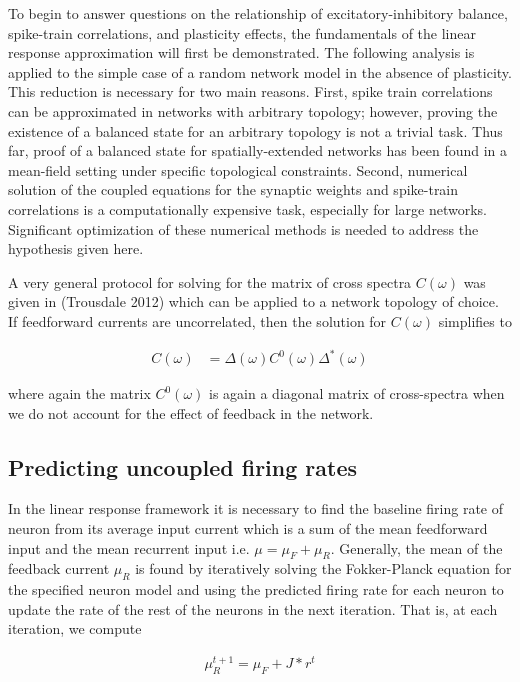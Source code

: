 \documentclass{ucetd}
\begin{document}
To begin to answer questions on the relationship of excitatory-inhibitory balance, spike-train correlations, and plasticity effects, the fundamentals of the linear response approximation will first be demonstrated. The following analysis is applied to the simple case of a random network model in the absence of plasticity. This reduction is necessary for two main reasons. First, spike train correlations can be approximated in networks with arbitrary topology; however, proving the existence of a balanced state for an arbitrary topology is not a trivial task. Thus far, proof of a balanced state for spatially-extended networks has been found in a mean-field setting under specific topological constraints. Second, numerical solution of the coupled equations for the synaptic weights and spike-train correlations is a computationally expensive task, especially for large networks. Significant optimization of these numerical methods is needed to address the hypothesis given here.

A very general protocol for solving for the matrix of cross spectra $C(\omega)$ was given in (Trousdale 2012) which can be applied to a network topology of choice. If feedforward currents are uncorrelated, then the solution for $C(\omega)$ simplifies to 

\begin{align}
C(\omega) &= \Delta(\omega)C^{0}(\omega)\Delta^{*}(\omega)
\end{align}

where again the matrix $C^{0}(\omega)$ is again a diagonal matrix of cross-spectra when we do not account for the effect of feedback in the network. 

\subsection{Predicting uncoupled firing rates}

In the linear response framework it is necessary to find the baseline firing rate of neuron from its average input current which is a sum of the mean feedforward input and the mean recurrent input i.e. $\mu = \mu_{F} + \mu_{R}$. Generally, the mean of the feedback current $\mu_{R}$ is found by iteratively solving the Fokker-Planck equation for the specified neuron model and using the predicted firing rate for each neuron to update the rate of the rest of the neurons in the next iteration. That is, at each iteration, we compute

\begin{align*}
\mu_{R}^{t+1} = \mu_{F} + J * r^{t}
\end{align*}
\end{document}
